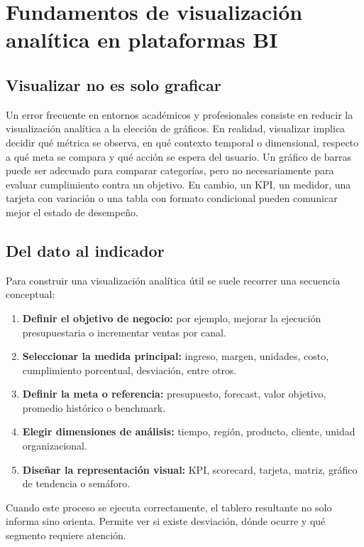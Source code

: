 \documentclass[12pt]{article}
\begin{document}
\section{Fundamentos de visualización analítica en plataformas BI}
\subsection{Visualizar no es solo graficar}
Un error frecuente en entornos académicos y profesionales consiste en reducir la visualización analítica a la elección de gráficos. En realidad, visualizar implica decidir qué métrica se observa, en qué contexto temporal o dimensional, respecto a qué meta se compara y qué acción se espera del usuario. Un gráfico de barras puede ser adecuado para comparar categorías, pero no necesariamente para evaluar cumplimiento contra un objetivo. En cambio, un KPI, un medidor, una tarjeta con variación o una tabla con formato condicional pueden comunicar mejor el estado de desempeño.

\subsection{Del dato al indicador}
Para construir una visualización analítica útil se suele recorrer una secuencia conceptual:
\begin{enumerate}[label=\textbf{V\arabic*.}, leftmargin=*]
\item \textbf{Definir el objetivo de negocio:} por ejemplo, mejorar la ejecución presupuestaria o incrementar ventas por canal.
\item \textbf{Seleccionar la medida principal:} ingreso, margen, unidades, costo, cumplimiento porcentual, desviación, entre otros.
\item \textbf{Definir la meta o referencia:} presupuesto, forecast, valor objetivo, promedio histórico o benchmark.
\item \textbf{Elegir dimensiones de análisis:} tiempo, región, producto, cliente, unidad organizacional.
\item \textbf{Diseñar la representación visual:} KPI, scorecard, tarjeta, matriz, gráfico de tendencia o semáforo.
\end{enumerate}

Cuando este proceso se ejecuta correctamente, el tablero resultante no solo informa sino orienta. Permite ver si existe desviación, dónde ocurre y qué segmento requiere atención.
\end{document}
